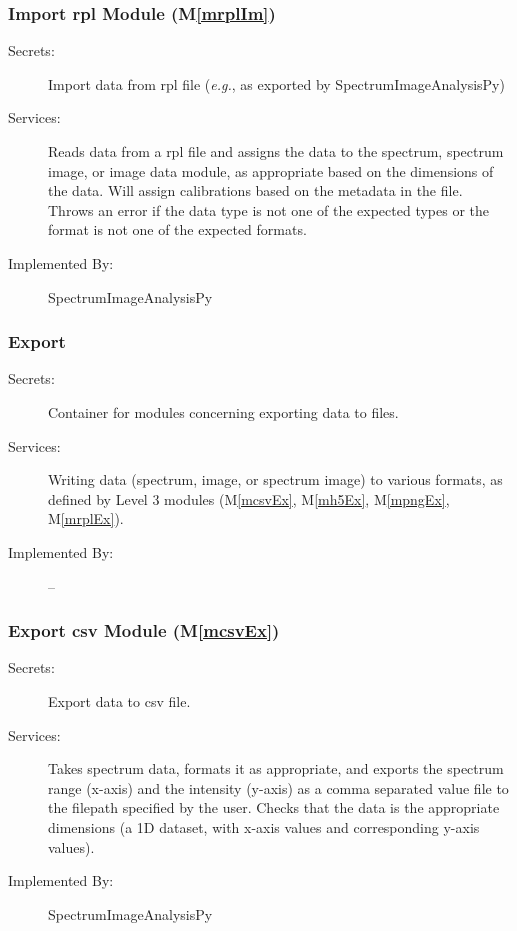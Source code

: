 \documentclass[12pt, titlepage]{article}
\newcommand{\mref}[1]{M\ref{#1}}
\newcommand{\progname}{SpectrumImageAnalysisPy}
\begin{document}
\subsubsection{Import rpl Module (\mref{mrplIm})}
\begin{description}
	\item[Secrets:]Import data from rpl file (\textit{e.g.}, as exported by
\progname)
	\item[Services:]Reads data from a rpl file and assigns the data to the
spectrum, spectrum image, or image data module, as appropriate based on the
dimensions of the data. Will assign calibrations based on the metadata in the
file. Throws an error if the data type is not one of the expected types or the
format is not one of the expected formats.
	\item[Implemented By:] \progname
\end{description}

\subsubsection{Export}
\begin{description}
	\item[Secrets:]Container for modules concerning exporting data to files.
	\item[Services:]Writing data (spectrum, image, or spectrum image) to various
formats, as defined by Level 3 modules (\mref{mcsvEx}, \mref{mh5Ex},
\mref{mpngEx}, \mref{mrplEx}).
	\item[Implemented By:] --
\end{description}

\subsubsection{Export csv Module (\mref{mcsvEx})}
\begin{description}
	\item[Secrets:]Export data to csv file.
	\item[Services:]Takes spectrum data, formats it as appropriate, and exports the
spectrum range (x-axis) and the intensity (y-axis) as a comma separated value
file to the filepath specified by the user. Checks that the data is the
appropriate dimensions (a 1D dataset, with x-axis values and corresponding
y-axis values).
	\item[Implemented By:] \progname
\end{description}
\end{document}
